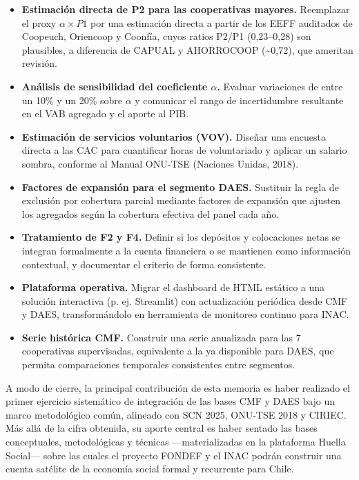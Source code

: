 \begin{itemize}
    \item \textbf{Estimación directa de P2 para las cooperativas mayores.} Reemplazar el proxy $\alpha \times P1$ por una estimación directa a partir de los EEFF auditados de Coopeuch, Oriencoop y Coonfía, cuyos ratios P2/P1 (0,23--0,28) son plausibles, a diferencia de CAPUAL y AHORROCOOP (\textasciitilde0,72), que ameritan revisión.

    \item \textbf{Análisis de sensibilidad del coeficiente $\alpha$.} Evaluar variaciones de entre un 10\% y un 20\% sobre $\alpha$ y comunicar el rango de incertidumbre resultante en el VAB agregado y el aporte al PIB.

    \item \textbf{Estimación de servicios voluntarios (VOV).} Diseñar una encuesta directa a las CAC para cuantificar horas de voluntariado y aplicar un salario sombra, conforme al Manual ONU-TSE (Naciones Unidas, 2018).

    \item \textbf{Factores de expansión para el segmento DAES.} Sustituir la regla de exclusión por cobertura parcial mediante factores de expansión que ajusten los agregados según la cobertura efectiva del panel cada año.

    \item \textbf{Tratamiento de F2 y F4.} Definir si los depósitos y colocaciones netas se integran formalmente a la cuenta financiera o se mantienen como información contextual, y documentar el criterio de forma consistente.

    \item \textbf{Plataforma operativa.} Migrar el dashboard de HTML estático a una solución interactiva (p. ej. Streamlit) con actualización periódica desde CMF y DAES, transformándolo en herramienta de monitoreo continuo para INAC.

    \item \textbf{Serie histórica CMF.} Construir una serie anualizada para las 7 cooperativas supervisadas, equivalente a la ya disponible para DAES, que permita comparaciones temporales consistentes entre segmentos.
\end{itemize}

A modo de cierre, la principal contribución de esta memoria es haber realizado el primer ejercicio sistemático de integración de las bases CMF y DAES bajo un marco metodológico común, alineado con SCN 2025, ONU-TSE 2018 y CIRIEC. Más allá de la cifra obtenida, su aporte central es haber sentado las bases conceptuales, metodológicas y técnicas —materializadas en la plataforma Huella Social— sobre las cuales el proyecto FONDEF y el INAC podrán construir una cuenta satélite de la economía social formal y recurrente para Chile.
